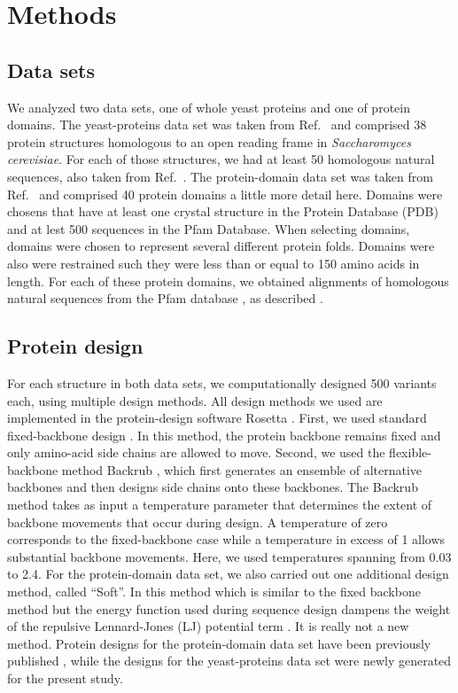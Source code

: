 \documentclass[12pt]{article}
\begin{document}
\section{Methods}
\label{Methods}

\subsection{Data sets}

We analyzed two data sets, one of whole yeast proteins and one of protein domains. The yeast-proteins data set was taken from Ref.\ \cite{Ramsey2011} and comprised 38 protein structures homologous to an open reading frame in \emph{Saccharomyces cerevisiae}. For each of those structures, we had at least 50 homologous natural sequences, also taken from Ref.\ \cite{Ramsey2011}. The protein-domain data set was taken from Ref.\ \cite{OllikainenKortemme} and comprised 40 protein domains {\color{red} a little more detail here. Domains were chosens that have at least one crystal structure in the Protein Database (PDB) and at lest 500 sequences in the Pfam Database. When selecting domains, domains were chosen to represent several different protein folds. Domains were also were restrained such they were less than or equal to 150 amino acids in length.}  For each of these protein domains, we obtained alignments of homologous natural sequences from the Pfam database \cite{Pfam}, as described \cite{OllikainenKortemme}.  

\subsection{Protein design}

For each structure in both data sets, we computationally designed 500 variants each, using multiple design methods. All design methods we used are implemented in the protein-design software Rosetta \cite{generic-rosetta-reference}. First, we used standard fixed-backbone design \cite{fixed-design}. In this method, the protein backbone remains fixed and only amino-acid side chains are allowed to move. Second, we used the flexible-backbone method Backrub \cite{Smith2008}, which first generates an ensemble of alternative backbones and then designs side chains onto these backbones. The Backrub method takes as input a temperature parameter that determines the extent of backbone movements that occur during design. A temperature of zero corresponds to the fixed-backbone case while a temperature in excess of 1 allows substantial backbone movements. Here, we used temperatures spanning from 0.03 to 2.4. For the protein-domain data set, we also carried out one additional design method, called ``Soft''. In this method which is similar to the fixed backbone method but the energy function used during sequence design dampens the weight of the repulsive Lennard-Jones (LJ) potential term \cite{OllikainenKortemme}. It is really not a new method. Protein designs for the protein-domain data set have been previously published \cite{OllikainenKortemme}, while the designs for the yeast-proteins data set were newly generated for the present study.
\end{document}
